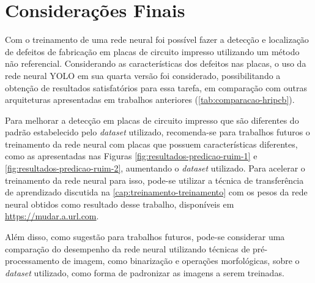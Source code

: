 \chapter{Considerações Finais}
Com o treinamento de uma rede neural foi possível fazer a detecção e localização de defeitos de fabricação em placas de circuito impresso utilizando um método não referencial. Considerando as características dos defeitos nas placas, o uso da rede neural YOLO em sua quarta versão foi considerado, possibilitando a obtenção de resultados satisfatórios para essa tarefa, em comparação com outras arquiteturas apresentadas em trabalhos anteriores (\autoref{tab:comparacao-hripcb}).

Para melhorar a detecção em placas de circuito impresso que são diferentes do padrão estabelecido pelo \textit{dataset} utilizado, recomenda-se para trabalhos futuros o treinamento da rede neural com placas que possuem características diferentes, como as apresentadas nas Figuras \ref{fig:resultados-predicao-ruim-1} e \ref{fig:resultados-predicao-ruim-2}, aumentando o \textit{dataset} utilizado.  Para acelerar o treinamento da rede neural para isso, pode-se utilizar a técnica de transferência de aprendizado discutida na \autoref{cap:treinamento-treinamento} com os pesos da rede neural obtidos como resultado desse trabalho, disponíveis em \url{https://mudar.a.url.com}.

Além disso, como sugestão para trabalhos futuros, pode-se considerar uma comparação do desempenho da rede neural utilizando técnicas de pré-processamento de imagem, como binarização e operações morfológicas, sobre o \textit{dataset} utilizado, como forma de padronizar as imagens a serem treinadas.
